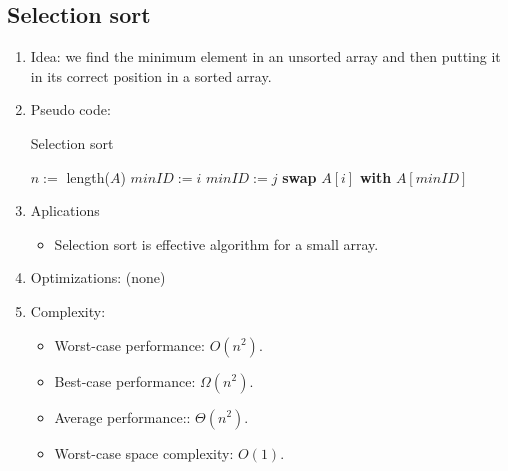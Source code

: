 \documentclass[12pt]{article}
\begin{document}
    \subsection{Selection sort}
    \begin{enumerate}
        \item Idea: we find the minimum element in an unsorted array and then putting it in its correct position in a sorted array.
        \item Pseudo code:
        \begin{algorithm}[H]
            \caption{Selection sort}
            \begin{algorithmic}[1]
                    \State $n:=$ length($A$)
                        \State $\textit{minID}:=i$
                                \State $\textit{minID}:=j$
                            \EndIf
                        \EndFor
                        \State \textbf{swap} $A[i]$ \textbf{with} $A[\textit{minID}]$
                    \EndFor
                \EndFunction
            \end{algorithmic}
        \end{algorithm}
        \item Aplications
        \begin{itemize}
            \item Selection sort is effective algorithm for a small array.
        \end{itemize}
        \item Optimizations: (none)
        \item Complexity:
        \begin{itemize}
            \item Worst-case performance: $O(n^2)$.
            \item Best-case performance: $\Omega(n^2)$.
            \item Average performance:: $\Theta(n^2)$.
            \item Worst-case space complexity: $O(1)$.
        \end{itemize}
    \end{enumerate}

    \newpage
\end{document}
